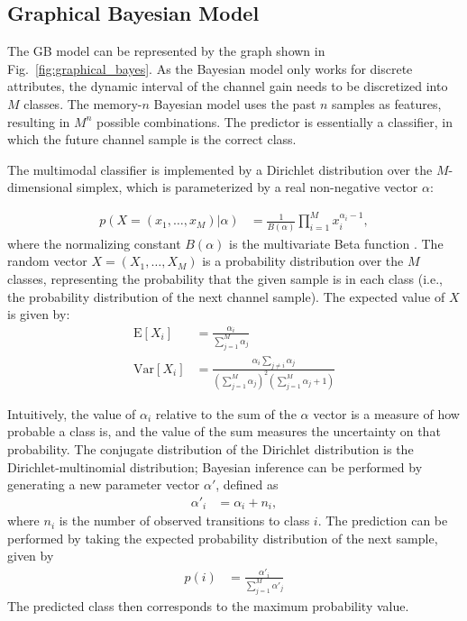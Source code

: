 \documentclass[conference, a4paper]{IEEEtran}
\begin{document}
\subsection{Graphical Bayesian Model}

The GB model can be represented by the graph shown in Fig.~\ref{fig:graphical_bayes}. As the Bayesian model only works for discrete attributes, the dynamic interval of the channel gain needs to be discretized into $M$ classes. The memory-$n$ Bayesian model uses the past $n$ samples as features, resulting in $M^n$ possible combinations. The predictor is essentially a classifier, in which the future  channel sample is the correct class.

The multimodal classifier is implemented by a Dirichlet distribution \cite{geiger1995characterization} over the $M$-dimensional simplex, which is parameterized by a real non-negative vector $\alpha$:

\begin{align}
 p(X=(x_1,\dots,x_M)|\alpha)&=\frac{1}{B(\alpha)}\prod_{i=1}^M x_i^{\alpha_i-1},
\end{align}
where the normalizing constant $B(\alpha)$ is the multivariate Beta function \cite{NIST:DLMF}. The random vector $X=(X_1,\dots,X_M)$ is a probability distribution over the $M$ classes, representing the probability that the given sample is in each class (i.e., the probability distribution of the next channel sample). The expected value of $X$ is given by:
\begin{align}
 \text{E}[X_i]&=\frac{\alpha_i}{\sum_{j=1}^M \alpha_j}\\
 \text{Var}[X_i]&=\frac{\alpha_i\sum_{j\neq i} \alpha_j}{(\sum_{j=1}^M \alpha_j)^2(\sum_{j=1}^M \alpha_j+1)}
\end{align}

Intuitively, the value of $\alpha_i$ relative to the sum of the $\alpha$ vector is a measure of how probable a class is, and the value of the sum measures the uncertainty on that probability. The conjugate distribution of the Dirichlet distribution is the Dirichlet-multinomial distribution; Bayesian inference can be performed by generating a new parameter vector $\alpha'$, defined as
\begin{align}
 \alpha'_i&=\alpha_i+n_i,
\end{align}
where $n_i$ is the number of observed transitions to class $i$. The prediction can be performed by taking the expected probability distribution of the next sample, given by
\begin{align}
 p(i)&=\frac{\alpha'_i}{\sum_{j=1}^M \alpha'_j}
\end{align}
The predicted class then corresponds to the maximum probability value.
\end{document}
